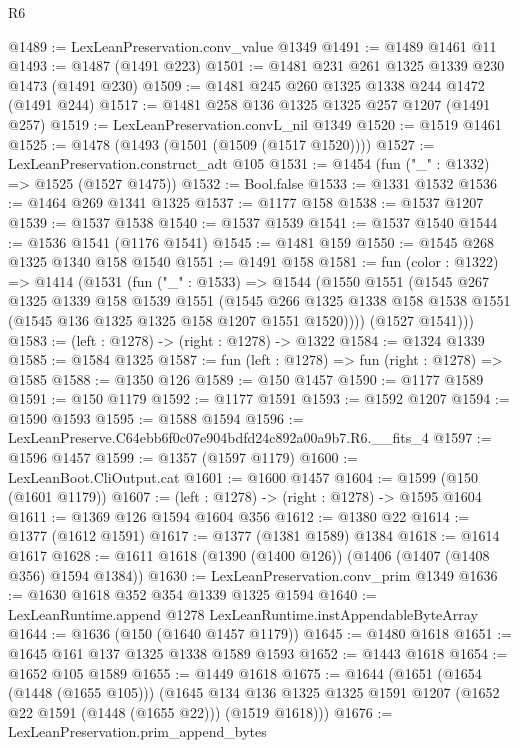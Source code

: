 \begin{lexlean}{R6}
\begin{coremodule}
@1489 := LexLeanPreservation.conv_value @1349
@1491 := @1489 @1461 @11
@1493 := @1487 (@1491 @223)
@1501 := @1481 @231 @261 @1325 @1339 @230 @1473 (@1491 @230)
@1509 := @1481 @245 @260 @1325 @1338 @244 @1472 (@1491 @244)
@1517 := @1481 @258 @136 @1325 @1325 @257 @1207 (@1491 @257)
@1519 := LexLeanPreservation.convL_nil @1349
@1520 := @1519 @1461
@1525 := @1478 (@1493 (@1501 (@1509 (@1517 @1520))))
@1527 := LexLeanPreservation.construct_adt @105
@1531 := @1454 (fun ("_" : @1332) => @1525 (@1527 @1475))
@1532 := Bool.false
@1533 := @1331 @1532
@1536 := @1464 @269 @1341 @1325
@1537 := @1177 @158
@1538 := @1537 @1207
@1539 := @1537 @1538
@1540 := @1537 @1539
@1541 := @1537 @1540
@1544 := @1536 @1541 (@1176 @1541)
@1545 := @1481 @159
@1550 := @1545 @268 @1325 @1340 @158 @1540
@1551 := @1491 @158
@1581 := fun (color : @1322) =>
  @1414
    (@1531
      (fun ("_" : @1533) =>
      @1544
        (@1550
          @1551
          (@1545
            @267
            @1325
            @1339
            @158
            @1539
            @1551
            (@1545
              @266
              @1325
              @1338
              @158
              @1538
              @1551
              (@1545 @136 @1325 @1325 @158 @1207 @1551 @1520))))
        (@1527 @1541)))
@1583 := (left : @1278) -> (right : @1278) -> @1322
@1584 := @1324 @1339
@1585 := @1584 @1325
@1587 := fun (left : @1278) => fun (right : @1278) => @1585
@1588 := @1350 @126
@1589 := @150 @1457
@1590 := @1177 @1589
@1591 := @150 @1179
@1592 := @1177 @1591
@1593 := @1592 @1207
@1594 := @1590 @1593
@1595 := @1588 @1594
@1596 := LexLeanPreserve.C64ebb6f0c07e904bdfd24c892a00a9b7.R6.__fits_4
@1597 := @1596 @1457
@1599 := @1357 (@1597 @1179)
@1600 := LexLeanBoot.CliOutput.cat
@1601 := @1600 @1457
@1604 := @1599 (@150 (@1601 @1179))
@1607 := (left : @1278) -> (right : @1278) -> @1595 @1604
@1611 := @1369 @126 @1594 @1604 @356
@1612 := @1380 @22
@1614 := @1377 (@1612 @1591)
@1617 := @1377 (@1381 @1589) @1384
@1618 := @1614 @1617
@1628 := @1611 @1618 (@1390 (@1400 @126)) (@1406 (@1407 (@1408 @356) @1594 @1384))
@1630 := LexLeanPreservation.conv_prim @1349
@1636 := @1630 @1618 @352 @354 @1339 @1325 @1594
@1640 := LexLeanRuntime.append @1278 LexLeanRuntime.instAppendableByteArray
@1644 := @1636 (@150 (@1640 @1457 @1179))
@1645 := @1480 @1618
@1651 := @1645 @161 @137 @1325 @1338 @1589 @1593
@1652 := @1443 @1618
@1654 := @1652 @105 @1589
@1655 := @1449 @1618
@1675 := @1644
    (@1651
      (@1654 (@1448 (@1655 @105)))
      (@1645 @134 @136 @1325 @1325 @1591 @1207 (@1652 @22 @1591 (@1448 (@1655 @22))) (@1519 @1618)))
@1676 := LexLeanPreservation.prim_append_bytes

\end{coremodule}
\end{lexlean}
